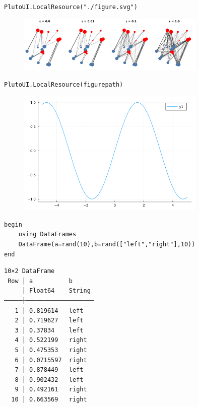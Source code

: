 \begin{lstlisting}[language=JuliaLocal, style=julia]
PlutoUI.LocalResource("./figure.svg")
\end{lstlisting}

\begin{figure}[H]
	\centering
	\includegraphics[width=0.8\textwidth]{./figures/figure}
	\label{fig:/home/davibarreira/MEGA/EMAp/NotebookToLatex.jl/test/pluto/./figure.svg}

\end{figure}

\begin{lstlisting}[language=JuliaLocal, style=julia]
PlutoUI.LocalResource(figurepath)
\end{lstlisting}

\begin{figure}[H]
	\centering
	\includegraphics[width=0.8\textwidth]{./figures/plotexample.png}
	\label{fig:/home/davibarreira/MEGA/EMAp/NotebookToLatex.jl/test/pluto/plotexample.png}

\end{figure}

\begin{lstlisting}[language=JuliaLocal, style=julia]
begin
	using DataFrames
	DataFrame(a=rand(10),b=rand(["left","right"],10))
end
\end{lstlisting}

\begin{verbatim}
10×2 DataFrame
 Row │ a          b
     │ Float64    String
─────┼───────────────────
   1 │ 0.819614   left
   2 │ 0.719627   left
   3 │ 0.37834    left
   4 │ 0.522199   right
   5 │ 0.475353   right
   6 │ 0.0715597  right
   7 │ 0.878449   left
   8 │ 0.902432   left
   9 │ 0.492161   right
  10 │ 0.663569   right
\end{verbatim}
